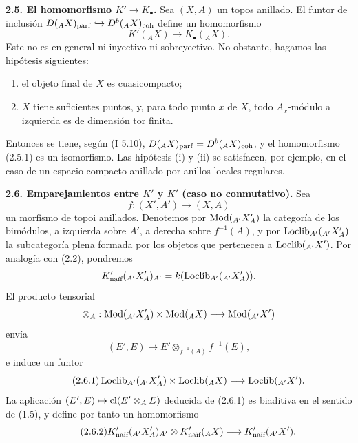 \textbf{2.5. El homomorfismo \(K'\to K_\bullet\).} Sea \((X,A)\) un topos anillado. El funtor de inclusión \(D({}_A X)_{\parf}\hookrightarrow D^b({}_A X)_{\coh}\) define un homomorfismo
\begin{equation}\tag{2.5.1}
 K'({}_A X)\longrightarrow K_\bullet({}_A X).
\end{equation}
Este no es en general ni inyectivo ni sobreyectivo. No obstante, hagamos las hipótesis siguientes:
\begin{enumerate}[label=(\roman*)]
\item el objeto final de \(X\) es cuasicompacto;
\item \(X\) tiene suficientes puntos, y, para todo punto \(x\) de \(X\), todo \(A_x\)-módulo a izquierda es de dimensión tor finita.
\end{enumerate}
Entonces se tiene, según (I 5.10), \(D({}_A X)_{\parf}=D^b({}_A X)_{\coh}\), y el homomorfismo (2.5.1) es un isomorfismo. Las hipótesis (i) y (ii) se satisfacen, por ejemplo, en el caso de un espacio compacto anillado por anillos locales regulares.

\textbf{2.6. Emparejamientos entre \(K'\) y \(K'\) (caso no conmutativo).} Sea
\[
 f:(X',A')\longrightarrow (X,A)
\]
un morfismo de topoi anillados. Denotemos por \(\Mod({}_{A'} X'_A)\) la categoría de los bimódulos, a izquierda sobre \(A'\), a derecha sobre \(f^{-1}(A)\), y por \(\Loclib_{A'}({}_{A'} X'_A)\) la subcategoría plena formada por los objetos que pertenecen a \(\Loclib({}_{A'} X')\). Por analogía con (2.2), pondremos
\[
 K'_{\naif}({}_{A'} X'_A)_{A'}=k(\Loclib_{A'}({}_{A'} X'_A)).
\]
El producto tensorial
\[
 \otimes_A:\Mod({}_{A'} X'_A)\times\Mod({}_A X)\longrightarrow \Mod({}_{A'} X')
\]
envía
\[
 (E',E)\longmapsto E'\otimes_{f^{-1}(A)}f^{-1}(E),
\]
e induce un funtor
\begin{equation}\tag{2.6.1}
 \Loclib_{A'}({}_{A'} X'_A)\times\Loclib({}_A X)\longrightarrow\Loclib({}_{A'} X').
\end{equation}
La aplicación \((E',E)\mapsto\cl(E'\otimes_A E)\) deducida de (2.6.1) es biaditiva en el sentido de (1.5), y define por tanto un homomorfismo
\begin{equation}\tag{2.6.2}
 K'_{\naif}({}_{A'} X'_A)_{A'}\otimes K'_{\naif}({}_A X)\longrightarrow K'_{\naif}({}_{A'} X').
\end{equation}

